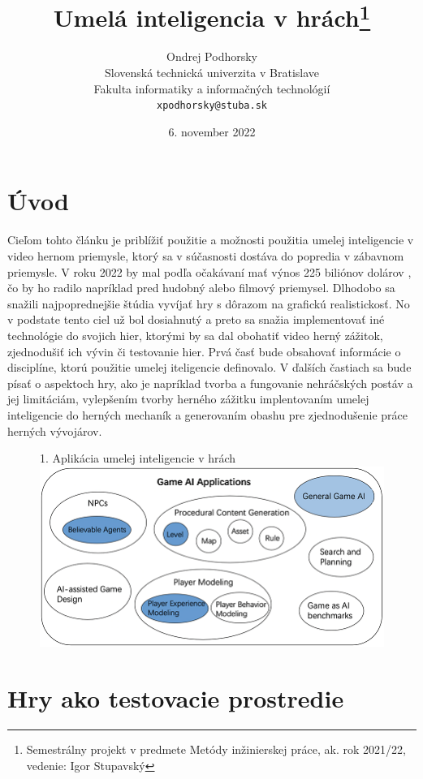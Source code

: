 \documentclass{article}
\title{Umelá inteligencia v hrách\thanks{Semestrálny projekt v predmete Metódy inžinierskej práce, ak. rok 2021/22, vedenie: Igor Stupavský}}
\author{Ondrej Podhorsky\\[2pt]
	{\small Slovenská technická univerzita v Bratislave}\\
	{\small Fakulta informatiky a informačných technológií}\\
	{\small \texttt{xpodhorsky@stuba.sk}}
	}
\date{\small 6. november 2022}
\begin{document}
\maketitle

\section{Úvod}

Cieľom tohto článku je priblížiť použitie a možnosti použitia umelej inteligencie v video hernom priemysle, ktorý sa v súčasnosti dostáva do popredia v zábavnom priemysle. V roku 2022 by mal podľa očakávaní mať výnos 225 biliónov dolárov \cite{TeodoraDobrilovat}, čo by ho radilo napríklad pred hudobný alebo filmový priemysel. Dlhodobo sa snažili najpoprednejšie štúdia vyvíjať hry s dôrazom  na grafickú realistickosť. No v podstate tento ciel už bol dosiahnutý a preto sa snažia implementovať iné technológie do svojich hier, ktorými by sa dal obohatiť video herný zážitok, zjednodušiť ich vývin či testovanie hier. Prvá časť bude obsahovať informácie o disciplíne, ktorú použitie umelej iteligencie definovalo. V ďalších častiach sa bude písať o aspektoch hry, ako je napríklad tvorba a fungovanie nehráčských postáv a jej limitáciám, vylepšením tvorby herného zážitku implentovaním umelej inteligencie do herných mechaník a generovaním obashu pre zjednodušenie práce herných vývojárov.

\begin{figure}{1. Aplikácia umelej inteligencie v hrách\cite{inproceedings}}
\centering
\includegraphics[width=\textwidth]{Game-AI-Applications.png}
\end{figure}

\clearpage

\section{Hry ako testovacie prostredie}
\end{document}
